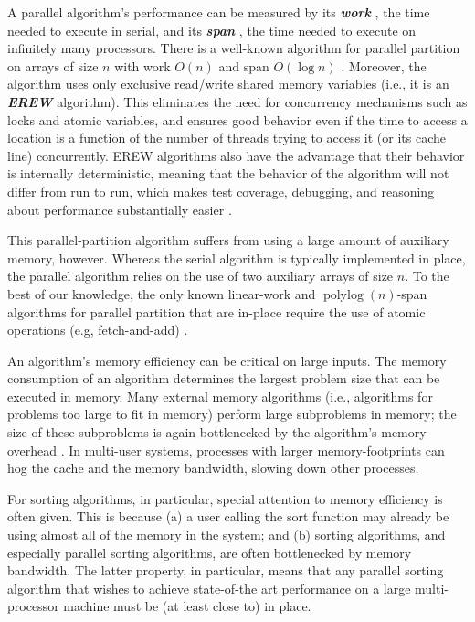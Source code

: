 \documentclass[11pt]{article}
\newcommand{\defn}[1]{{\textit{\textbf{\boldmath #1}}} }
\theoremstyle{remark}
\theoremstyle{remark}
\begin{document}
A parallel algorithm's performance can be measured by its \defn{work}, the time
needed to execute in serial, and its \defn{span}, the time needed to execute
on infinitely many processors. There is a well-known algorithm for
parallel partition on arrays of size $n$ with work $O(n)$ and span
$O(\log n)$ \cite{Blelloch96,AcarBl16}. Moreover, the algorithm uses
only exclusive read/write shared memory variables (i.e., it is an
\defn{EREW} algorithm). This eliminates the need for concurrency
mechanisms such as locks and atomic variables, and ensures good
behavior even if the time to access a location is a function of the
number of threads trying to access it (or its cache line)
concurrently. EREW algorithms also have the advantage that their
behavior is internally deterministic, meaning that
the behavior of the algorithm will not differ from run to run, which
makes test coverage, debugging, and reasoning about performance
substantially easier \cite{BlellochFi12}.

This parallel-partition algorithm suffers from using a large amount of
auxiliary memory, however. Whereas the serial algorithm is typically
implemented in place, the parallel algorithm relies on the use of two
auxiliary arrays of size $n$. To the best of our knowledge, the only
known linear-work and $\operatorname{polylog}(n)$-span algorithms for
parallel partition that are in-place require the use of atomic
operations (e.g, fetch-and-add)
\cite{HeidelbergerNo90,AxtmannWi17,TsigasZh03}.

An algorithm's memory efficiency can be critical on large inputs. The
memory consumption of an algorithm determines the largest problem size
that can be executed in memory. Many external memory algorithms (i.e.,
algorithms for problems too large to fit in memory) perform large
subproblems in memory; the size of these subproblems is again
bottlenecked by the algorithm's memory-overhead \cite{Vitter08}. In
multi-user systems, processes with larger memory-footprints can hog
the cache and the memory bandwidth, slowing down other processes.

For sorting algorithms, in particular, special attention to memory
efficiency is often given. This is because (a) a user calling the sort
function may already be using almost all of the memory in the system;
and (b) sorting algorithms, and especially parallel sorting
algorithms, are often bottlenecked by memory bandwidth. The latter
property, in particular, means that any parallel sorting algorithm
that wishes to achieve state-of-the art performance on a large
multi-processor machine must be (at least close to) in place.
\end{document}
